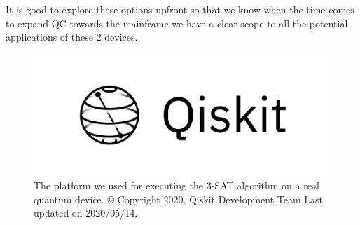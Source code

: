 It is good to explore these options upfront so that we know when the time comes to expand QC towards the mainframe we have a clear scope to all the potential applications of these 2 devices.


\begin{figure}[h]
	\centering
	\includegraphics[scale = 0.75]{../Demonstration/img/qiskit_logo.PNG}
	\caption{The platform we used for executing the 3-SAT algorithm on a real quantum device. © Copyright 2020, Qiskit Development Team Last updated on 2020/05/14.}
\end{figure}



